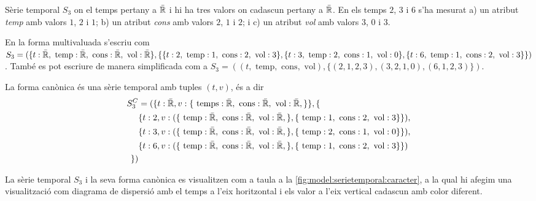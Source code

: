 \begin{example}
  Sèrie temporal $S_3$ on el temps pertany a $\bar{\mathbb{R}{}}$ i hi ha tres
  valors on cadascun pertany a $\bar{\mathbb{R}{}}$. En els temps $2$, $3$ i
  $6$ s'ha mesurat a) un atribut \emph{temp} amb valors $1$, $2$ i
  $1$; b) un atribut \emph{cons} amb valors $2$, $1$ i $2$; i c) un
  atribut \emph{vol} amb valors $3$, $0$ i $3$.



En la forma multivaluada s'escriu com %
$S_3 = ( \{t: \bar{\R{}}, \text{ temp}: \bar{\R{}}, \text{
  cons}: \bar{\R{}},\text{ vol}: \bar{\R{}} \}, %
\{%
\{t:2,\text{ temp}:1 , \text{ cons}:2,\text{ vol}:3 \}, %
\{t:3,\text{ temp}:2 , \text{ cons}:1,\text{ vol}:0 \}, %
\{t:6,\text{ temp}:1 , \text{ cons}:2,\text{ vol}:3 \} %
\} )$. També es pot escriure de manera simplificada com a $S_{3} = (
(t,\text{ temp},\text{ cons},\text{ vol}),\{ (2,1,2,3), (3,2,1,0),
(6,1,2,3) \})$.

La forma canònica és una sèrie temporal amb tuples $(t,v)$, és a dir
\begin{align*}
  S^C_{3} &= ( \{t: \bar{\mathbb{R}{}}, v: \{ \text{ temps}:
  \bar{\mathbb{R}{}}, \text{ cons}: \bar{\mathbb{R}{}},\text{ vol}:
  \bar{\mathbb{R}{}},\} \}, \{ \\
  & \{t:2, v: ( \{ \text{ temp}: \bar{\mathbb{R}{}}, \text{ cons}:
  \bar{\mathbb{R}{}},\text{ vol}: \bar{\mathbb{R}{}},\}, \{ \text{ temp}:1
  ,  \text{ cons}:2,\text{ vol}:3 \}\} ), \\
 & \{t:3, v: ( \{ \text{ temp}: \bar{\mathbb{R}{}}, \text{ cons}:
  \bar{\mathbb{R}{}},\text{ vol}: \bar{\mathbb{R}{}},\}, \{ \text{ temp}:2
  ,  \text{ cons}:1,\text{ vol}:0 \}\} ), \\
 & \{t:6, v: ( \{ \text{ temp}: \bar{\mathbb{R}{}}, \text{ cons}:
  \bar{\mathbb{R}{}},\text{ vol}: \bar{\mathbb{R}{}},\}, \{ \text{ temp}:1
  ,  \text{ cons}:2,\text{ vol}:3 \}\} ) \\
  \} )
\end{align*}


La sèrie temporal $S_3$ i la seva forma canònica es visualitzen com a
taula a la \autoref{fig:model:serietemporal:caracter}, a la qual hi
afegim una visualització com diagrama de dispersió amb el temps a
l'eix horitzontal i els valor a l'eix vertical cadascun amb color
diferent.



\end{example}
